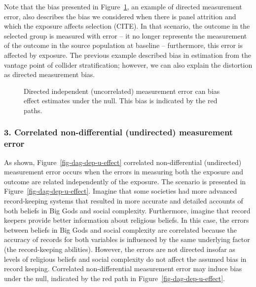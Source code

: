 \documentclass[
  singlecolumn,
  9pt]{article}
\begin{document}
Note that the bias presented in Figure~\ref{fig-dag-indep-d-effect}, an
example of directed measurement error, also describes the bias we
considered when there is panel attrition and which the exposure affects
selection (CITE). In that scenario, the outcome in the selected group is
measured with error -- it no longer represents the measurement of the
outcome in the source population at baseline -- furthermore, this error
is affected by exposure. The previous example described bias in
estimation from the vantage point of collider stratification; however,
we can also explain the distortion as directed measurement bias.

\begin{figure}


\caption{\label{fig-dag-indep-d-effect}Directed independent
(uncorrelated) measurement error can bias effect estimates under the
null. This bias is indicated by the red paths.}

\end{figure}%

\subsubsection{3. Correlated non-differential (undirected) measurement
error}\label{correlated-non-differential-undirected-measurement-error}

As shown, Figure~\ref{fig-dag-dep-u-effect} correlated non-differential
(undirected) measurement error occurs when the errors in measuring both
the exposure and outcome are related independently of the exposure. The
scenario is presented in Figure~\ref{fig-dag-dep-u-effect}. Imagine that
some societies had more advanced record-keeping systems that resulted in
more accurate and detailed accounts of both beliefs in Big Gods and
social complexity. Furthermore, imagine that record keepers provide
better information about religious beliefs. In this case, the errors
between beliefs in Big Gods and social complexity are correlated because
the accuracy of records for both variables is influenced by the same
underlying factor (the record-keeping abilities). However, the errors
are not directed insofar as levels of religious beliefs and social
complexity do not affect the assumed bias in record keeping. Correlated
non-differential measurement error may induce bias under the null,
indicated by the red path in Figure~\ref{fig-dag-dep-u-effect}.
\end{document}
